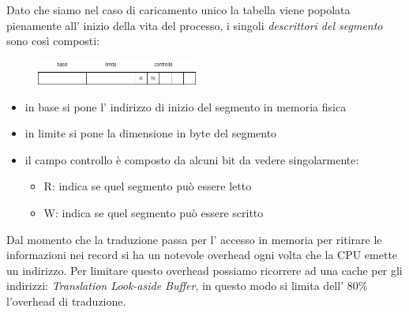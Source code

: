 Dato che siamo nel caso di caricamento unico la tabella viene popolata pienamente all' inizio della vita del processo, i singoli \emph{descrittori del segmento} sono così composti:
\begin{figure}[H]
    \centering
    \includegraphics[width=200px]{images/9_Gestione_della_memoria/segment_record_1.png}
\end{figure}
\begin{itemize}
    \item in base si pone l' indirizzo di inizio del segmento in memoria fisica
    \item in limite si pone la dimensione in byte del segmento
    \item il campo controllo è composto da alcuni bit da vedere singolarmente:
    \begin{itemize}
        \item R: indica se quel segmento può essere letto
        \item W: indica se quel segmento può essere scritto
    \end{itemize}
\end{itemize}

Dal momento che la traduzione passa per l' accesso in memoria per ritirare le informazioni nei record si ha un notevole overhead ogni volta che la CPU emette un indirizzo.
Per limitare questo overhead possiamo ricorrere ad una cache per gli indirizzi: \emph{Translation Look-aside Buffer}, in questo modo si limita dell' 80\% l'overhead di traduzione.

